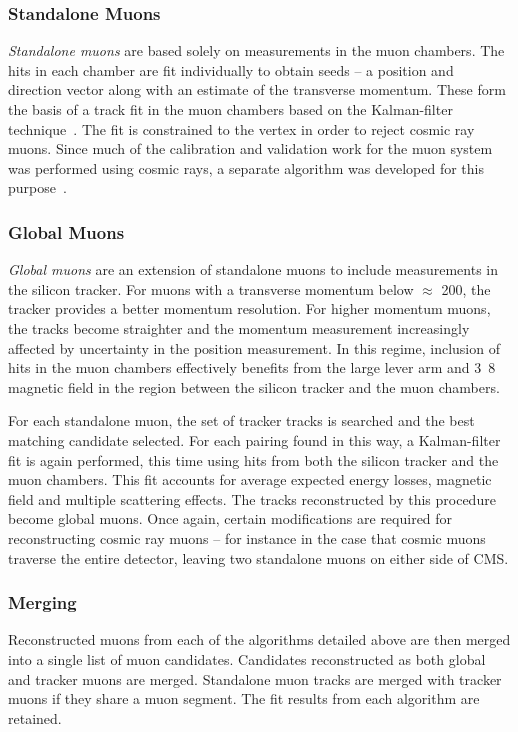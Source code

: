 \subsubsection{Standalone Muons}
\emph{Standalone muons} are based solely on measurements in the muon
chambers. The hits in each chamber are fit individually to obtain seeds -- a
position and direction vector along with an estimate of the transverse
momentum. These form the basis of a track fit in the muon chambers based on the
Kalman-filter technique~\cite{kalman_filter}. The fit is constrained to the
vertex in order to reject cosmic ray muons. Since much of the calibration and
validation work for the muon system was performed using cosmic rays, a separate
algorithm was developed for this purpose~\cite{cms_mu_reco_cosmic}.

\subsubsection{Global Muons}
\emph{Global muons} are an extension of standalone muons to include measurements
in the silicon tracker. For muons with a transverse momentum below $\approx$
\unit{200}{\GeV}, the tracker provides a better momentum resolution. For higher
momentum muons, the tracks become straighter and the momentum measurement
increasingly affected by uncertainty in the position measurement. In this
regime, inclusion of hits in the muon chambers effectively benefits from the
large lever arm and \unit{3.8}{\tesla} magnetic field in the region between the
silicon tracker and the muon chambers.

For each standalone muon, the set of tracker tracks is searched and the best
matching candidate selected. For each pairing found in this way, a Kalman-filter
fit is again performed, this time using hits from both the silicon tracker and
the muon chambers. This fit accounts for average expected energy losses,
magnetic field and multiple scattering effects. The tracks reconstructed by this
procedure become global muons. Once again, certain modifications are required for
reconstructing cosmic ray muons -- for instance in the case that cosmic muons
traverse the entire detector, leaving two standalone muons on either side of
\ac{CMS}.

\subsubsection{Merging}
Reconstructed muons from each of the algorithms detailed above are then merged
into a single list of muon candidates. Candidates reconstructed as both global
and tracker muons are merged. Standalone muon tracks are merged with tracker
muons if they share a muon segment. The fit results from each algorithm are
retained.

